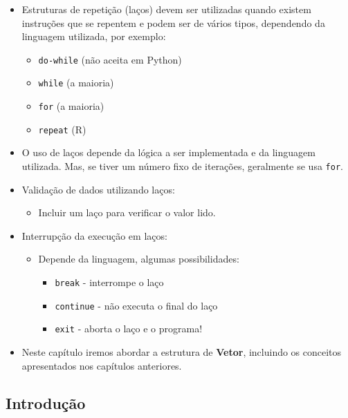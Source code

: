 \documentclass[12pt,a4paper]{article}
\providecommand{\tightlist}{%
      \setlength{\itemsep}{0pt}\setlength{\parskip}{0pt}}
\begin{document}
    \begin{itemize}
\tightlist
\item
  Estruturas de repetição (laços) devem ser utilizadas quando existem
  instruções que se repentem e podem ser de vários tipos, dependendo da
  linguagem utilizada, por exemplo:

  \begin{itemize}
  \tightlist
  \item
    \texttt{do-while} (não aceita em Python)
  \item
    \texttt{while} (a maioria)
  \item
    \texttt{for} (a maioria)
  \item
    \texttt{repeat} (R)
  \end{itemize}
\item
  O uso de laços depende da lógica a ser implementada e da linguagem
  utilizada. Mas, se tiver um número fixo de iterações, geralmente se
  usa \texttt{for}.
\item
  Validação de dados utilizando laços:

  \begin{itemize}
  \tightlist
  \item
    Incluir um laço para verificar o valor lido.
  \end{itemize}
\item
  Interrupção da execução em laços:

  \begin{itemize}
  \tightlist
  \item
    Depende da linguagem, algumas possibilidades:

    \begin{itemize}
    \tightlist
    \item
      \texttt{break} - interrompe o laço
    \item
      \texttt{continue} - não executa o final do laço
    \item
      \texttt{exit} - aborta o laço e o programa!
    \end{itemize}
  \end{itemize}
\item
  Neste capítulo iremos abordar a estrutura de \textbf{Vetor}, incluindo
  os conceitos apresentados nos capítulos anteriores.
\end{itemize}

    \hypertarget{introduuxe7uxe3o}{%
\subsection{Introdução}\label{introduuxe7uxe3o}}
\end{document}
